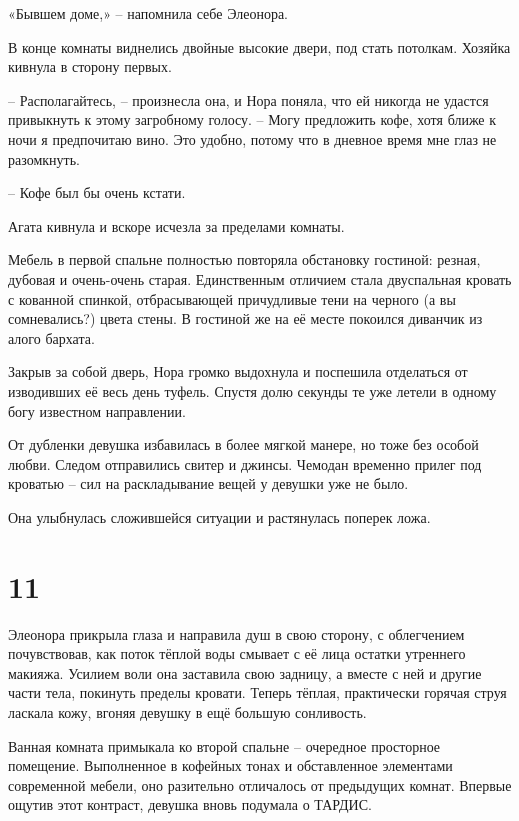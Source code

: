 \documentclass[
  a5paperpaper,
  DIV=11,
  numbers=noendperiod]{scrreprt}
\begin{document}
«Бывшем доме,» -- напомнила себе Элеонора.

В конце комнаты виднелись двойные высокие двери, под стать потолкам.
Хозяйка кивнула в сторону первых.

-- Располагайтесь, -- произнесла она, и Нора поняла, что ей никогда не
удастся привыкнуть к этому загробному голосу. -- Могу предложить кофе,
хотя ближе к ночи я предпочитаю вино. Это удобно, потому что в дневное
время мне глаз не разомкнуть.

-- Кофе был бы очень кстати.

Агата кивнула и вскоре исчезла за пределами комнаты.

Мебель в первой спальне полностью повторяла обстановку гостиной: резная,
дубовая и очень-очень старая. Единственным отличием стала двуспальная
кровать с кованной спинкой, отбрасывающей причудливые тени на черного (а
вы сомневались?) цвета стены. В гостиной же на её месте покоился
диванчик из алого бархата.

Закрыв за собой дверь, Нора громко выдохнула и поспешила отделаться от
изводивших её весь день туфель. Спустя долю секунды те уже летели в
одному богу известном направлении.

От дубленки девушка избавилась в более мягкой манере, но тоже без особой
любви. Следом отправились свитер и джинсы. Чемодан временно прилег под
кроватью -- сил на раскладывание вещей у девушки уже не было.

Она улыбнулась сложившейся ситуации и растянулась поперек ложа.

\section*{11}\label{11}


Элеонора прикрыла глаза и направила душ в свою сторону, с облегчением
почувствовав, как поток тёплой воды смывает с её лица остатки утреннего
макияжа. Усилием воли она заставила свою задницу, а вместе с ней и
другие части тела, покинуть пределы кровати. Теперь тёплая, практически
горячая струя ласкала кожу, вгоняя девушку в ещё большую сонливость.

Ванная комната примыкала ко второй спальне -- очередное просторное
помещение. Выполненное в кофейных тонах и обставленное элементами
современной мебели, оно разительно отличалось от предыдущих комнат.
Впервые ощутив этот контраст, девушка вновь подумала о ТАРДИС.
\end{document}

